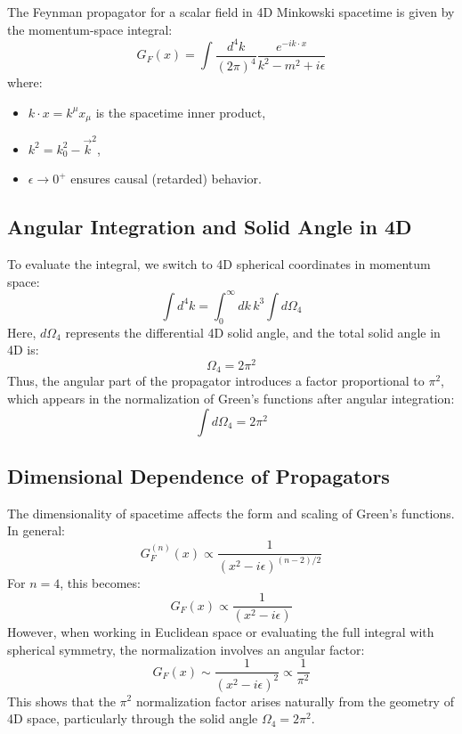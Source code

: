 \documentclass[12pt,a4paper]{article}
\begin{document}
The Feynman propagator for a scalar field in 4D Minkowski spacetime is given by the momentum-space integral:
\begin{equation}
G_F(x) = \int \frac{d^4 k}{(2\pi)^4} \frac{e^{-i k \cdot x}}{k^2 - m^2 + i \epsilon}
\end{equation}
where:
\begin{itemize}
    \item \(k \cdot x = k^\mu x_\mu\) is the spacetime inner product,
    \item \(k^2 = k_0^2 - \vec{k}^2\),
    \item \(\epsilon \to 0^+\) ensures causal (retarded) behavior.
\end{itemize}

\subsection{Angular Integration and Solid Angle in 4D}

To evaluate the integral, we switch to 4D spherical coordinates in momentum space:
\begin{equation}
\int d^4k = \int_0^\infty dk \, k^3 \int d\Omega_4
\end{equation}
Here, \(d\Omega_4\) represents the differential 4D solid angle, and the total solid angle in 4D is:
\begin{equation}
\Omega_4 = 2\pi^2
\end{equation}
Thus, the angular part of the propagator introduces a factor proportional to \(\pi^2\), which appears in the normalization of Green's functions after angular integration:
\begin{equation}
\int d\Omega_4 = 2\pi^2
\end{equation}

\subsection{Dimensional Dependence of Propagators}

The dimensionality of spacetime affects the form and scaling of Green's functions. In general:
\begin{equation}
G_F^{(n)}(x) \propto \frac{1}{(x^2 - i\epsilon)^{(n-2)/2}}
\end{equation}
For \(n = 4\), this becomes:
\begin{equation}
G_F(x) \propto \frac{1}{(x^2 - i\epsilon)}
\end{equation}
However, when working in Euclidean space or evaluating the full integral with spherical symmetry, the normalization involves an angular factor:
\begin{equation}
G_F(x) \sim \frac{1}{(x^2 - i\epsilon)^2} \propto \frac{1}{\pi^2}
\end{equation}
This shows that the \(\pi^2\) normalization factor arises naturally from the geometry of 4D space, particularly through the solid angle \(\Omega_4 = 2\pi^2\).
\end{document}
